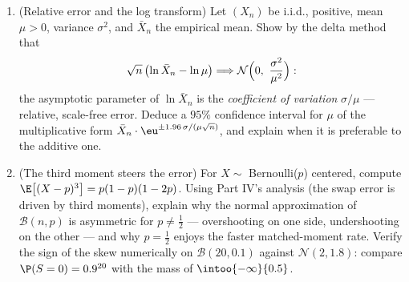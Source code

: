 \begin{problem}
\begin{enumerate}[resume]
  \item (Relative error and the log transform) Let $(X_n)$
        be i.i.d., positive, mean $\mu > 0$, variance
        $\sigma^2$, and $\bar X_n$ the empirical mean. Show
        by the delta method that
        \[
        \sqrt n\,\bigl(\ln\bar X_n - \ln\mu\bigr)
        \Longrightarrow
        \mathcal N\Bigl(0,\ \frac{\sigma^2}{\mu^2}\Bigr) :
        \]
        the asymptotic parameter of $\ln\bar X_n$ is the
        \emph{coefficient of variation} $\sigma/\mu$ ---
        relative, scale-free error. Deduce a $95\%$
        confidence interval for $\mu$ of the multiplicative
        form $\bar X_n\cdot\eu^{\pm1.96\,\sigma/(\mu\sqrt
        n)}$, and explain when it is preferable to the
        additive one.
  \item (The third moment steers the error) For $X \sim$
        Bernoulli($p$) centered, compute $\E\bigl[(X -
        p)^3\bigr] = p(1-p)(1-2p)$. Using Part IV's analysis
        (the swap error is driven by third moments), explain
        why the normal approximation of $\mathcal B(n, p)$
        is asymmetric for $p \neq \frac12$ --- overshooting
        on one side, undershooting on the other --- and why
        $p = \frac12$ enjoys the faster matched-moment rate.
        Verify the sign of the skew numerically on $\mathcal
        B(20, 0.1)$ against $\mathcal N(2, 1.8)$: compare
        $\P(S = 0) = 0.9^{20}$ with the  mass of
        $\intoo{-\infty}{0.5}$.
\end{enumerate}
\end{problem}

